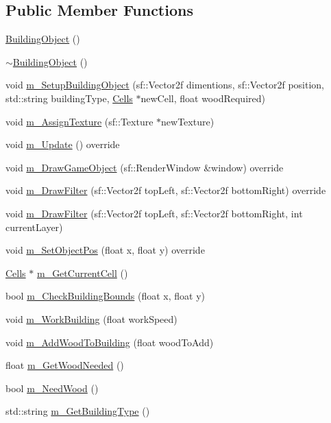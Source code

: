 \subsection*{Public Member Functions}
\begin{DoxyCompactItemize}
\item 
\mbox{\hyperlink{class_building_object_aab54197a4f72381251c422e530b5282f}{Building\+Object}} ()
\item 
\mbox{\hyperlink{class_building_object_a0a6779902609501186267d00d363bcde}{$\sim$\+Building\+Object}} ()
\item 
void \mbox{\hyperlink{class_building_object_a77221935bdcf6ef2cad7cd80fb877da8}{m\+\_\+\+Setup\+Building\+Object}} (sf\+::\+Vector2f dimentions, sf\+::\+Vector2f position, std\+::string building\+Type, \mbox{\hyperlink{class_cells}{Cells}} $\ast$new\+Cell, float wood\+Required)
\item 
void \mbox{\hyperlink{class_building_object_a74cbc1ffd32e6c4db6c645df2657e740}{m\+\_\+\+Assign\+Texture}} (sf\+::\+Texture $\ast$new\+Texture)
\item 
void \mbox{\hyperlink{class_building_object_a35fc31e0f1c9a1323b7dfedc527fccff}{m\+\_\+\+Update}} () override
\item 
void \mbox{\hyperlink{class_building_object_a7e343d32ad1f6aaed5ed484b2aabe700}{m\+\_\+\+Draw\+Game\+Object}} (sf\+::\+Render\+Window \&window) override
\item 
void \mbox{\hyperlink{class_building_object_a05e1b08fb5edd953b00e6deade8bad9d}{m\+\_\+\+Draw\+Filter}} (sf\+::\+Vector2f top\+Left, sf\+::\+Vector2f bottom\+Right) override
\item 
void \mbox{\hyperlink{class_building_object_a54130a69a81268544ca715275f52bfb7}{m\+\_\+\+Draw\+Filter}} (sf\+::\+Vector2f top\+Left, sf\+::\+Vector2f bottom\+Right, int current\+Layer)
\item 
void \mbox{\hyperlink{class_building_object_aa6239662e4277d8e1933f9c8fd487511}{m\+\_\+\+Set\+Object\+Pos}} (float x, float y) override
\item 
\mbox{\hyperlink{class_cells}{Cells}} $\ast$ \mbox{\hyperlink{class_building_object_aba3f08ddf833026289c2c0d36d0c40e3}{m\+\_\+\+Get\+Current\+Cell}} ()
\item 
bool \mbox{\hyperlink{class_building_object_a1d21e6caaa8853c9e60be5d80a5a42c1}{m\+\_\+\+Check\+Building\+Bounds}} (float x, float y)
\item 
void \mbox{\hyperlink{class_building_object_a3fd4003a55d98f537edfb002fc3726c1}{m\+\_\+\+Work\+Building}} (float work\+Speed)
\item 
void \mbox{\hyperlink{class_building_object_ade01ec444234c24eedc0286b5a7c85eb}{m\+\_\+\+Add\+Wood\+To\+Building}} (float wood\+To\+Add)
\item 
float \mbox{\hyperlink{class_building_object_a4cababbd690030d994111fbe8c7603b1}{m\+\_\+\+Get\+Wood\+Needed}} ()
\item 
bool \mbox{\hyperlink{class_building_object_aee720b050f8fed6e7f8cf773df7b0a3d}{m\+\_\+\+Need\+Wood}} ()
\item 
std\+::string \mbox{\hyperlink{class_building_object_af79abc387ac3519eb23bcea55a56a5b0}{m\+\_\+\+Get\+Building\+Type}} ()
\end{DoxyCompactItemize}
